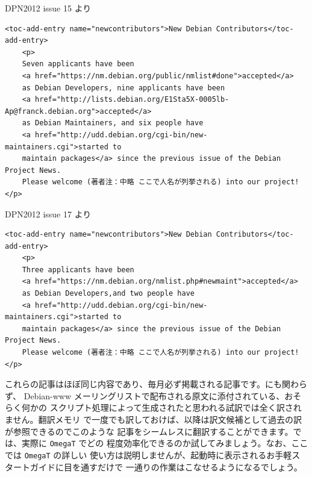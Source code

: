 \documentclass[mingoth,a4paper]{jsarticle}
\begin{document}
\begin{itembox}[c]{DPN2012 issue 15 より}
    \begin{verbatim}
<toc-add-entry name="newcontributors">New Debian Contributors</toc-add-entry>
	<p>
    Seven applicants have been
    <a href="https://nm.debian.org/public/nmlist#done">accepted</a>
    as Debian Developers, nine applicants have been
    <a href="http://lists.debian.org/E1Sta5X-0005lb-Ap@franck.debian.org">accepted</a>
    as Debian Maintainers, and six people have
    <a href="http://udd.debian.org/cgi-bin/new-maintainers.cgi">started to
    maintain packages</a> since the previous issue of the Debian Project News.
    Please welcome (著者注：中略 ここで人名が列挙される) into our project!</p>
    \end{verbatim}
\end{itembox}
\begin{itembox}[c]{DPN2012 issue 17 より}
    \begin{verbatim}
<toc-add-entry name="newcontributors">New Debian Contributors</toc-add-entry>
	<p>
    Three applicants have been
    <a href="https://nm.debian.org/nmlist.php#newmaint">accepted</a>
	as Debian Developers,and two people have
    <a href="http://udd.debian.org/cgi-bin/new-maintainers.cgi">started to
    maintain packages</a> since the previous issue of the Debian Project News.
    Please welcome (著者注：中略 ここで人名が列挙される) into our project!</p>
    \end{verbatim}
\end{itembox}

これらの記事はほぼ同じ内容であり、毎月必ず掲載される記事です。にも関わらず、
Debian-www メーリングリストで配布される原文に添付されている、おそらく何かの
スクリプト処理によって生成されたと思われる試訳では全く訳されません。翻訳メモリ
で一度でも訳しておけば、以降は訳文候補として過去の訳が参照できるのでこのような
記事をシームレスに翻訳することができます。では、実際に {\tt OmegaT} でどの
程度効率化できるのか試してみましょう。なお、ここでは {\tt OmegaT} の詳しい
使い方は説明しませんが、起動時に表示されるお手軽スタートガイドに目を通すだけで
一通りの作業はこなせるようになるでしょう。
\end{document}
